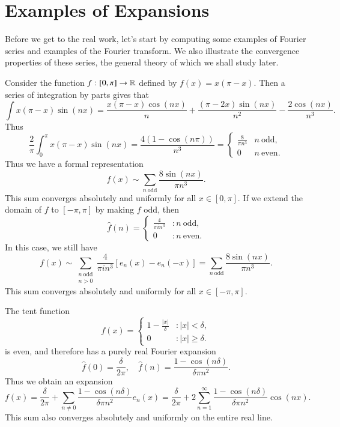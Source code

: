 \section{Examples of Expansions}

Before we get to the real work, let's start by computing some examples of Fourier series and examples of the Fourier transform. We also illustrate the convergence properties of these series, the general theory of which we shall study later.

\begin{example}
    Consider the function $f: [0,\pi] \to \operatorname{\mathbb{R}}$ defined by $f(x) = x(\pi - x)$. Then a series of integration by parts gives that
    \[ \int x(\pi - x) \sin(nx) = \frac{x(\pi - x) \cos(nx)}{n} + \frac{(\pi - 2x) \sin(nx)}{n^2} - \frac{2\cos(nx)}{n^3}. \]
    Thus
    \[ \frac{2}{\pi} \int_0^\pi x(\pi - x) \sin(nx) = \frac{4(1 - \cos(n\pi))}{n^3} = \begin{cases} \frac{8}{\pi n^3} & n\ \text{odd}, \\ 0 & n\ \text{even}. \end{cases}  \]
    Thus we have a formal representation
    \[ f(x) \sim \sum_{n\ \text{odd}} \frac{8 \sin(nx)}{\pi n^3}. \]
    This sum converges absolutely and uniformly for all $x \in [0,\pi]$. If we extend the domain of $f$ to $[-\pi,\pi]$ by making $f$ odd, then
    \[ \widehat{f}(n) = \begin{cases} \frac{4}{\pi i n^3} & : n\ \text{odd}, \\ 0 & : n\ \text{even}. \end{cases} \]
    In this case, we still have
    \[ f(x) \sim \sum_{\substack{n\ \text{odd}\\ n > 0}} \frac{4}{\pi i n^3} [e_n(x) - e_n(-x)] = \sum_{n\ \text{odd}} \frac{8 \sin(nx)}{\pi n^3}. \]
    This sum converges absolutely and uniformly for all $x \in [-\pi,\pi]$.
\end{example}

\begin{example}
    The tent function
    \[ f(x) = \begin{cases} 1 - \frac{|x|}{\delta} & : |x| < \delta, \\ 0 & : |x| \geq \delta. \end{cases} \]
    is even, and therefore has a purely real Fourier expansion
    \[ \widehat{f}(0) = \frac{\delta}{2\pi},\quad\widehat{f}(n) = \frac{1 - \cos(n\delta)}{\delta \pi n^2}. \]
    Thus we obtain an expansion
    \[ f(x) = \frac{\delta}{2\pi} + \sum_{n \neq 0} \frac{1 - \cos(n\delta)}{\delta \pi n^2} e_n(x) = \frac{\delta}{2 \pi} + 2 \sum_{n = 1}^\infty \frac{1 - \cos(n\delta)}{\delta \pi n^2} \cos(nx). \]
    This sum also converges absolutely and uniformly on the entire real line.
\end{example}

